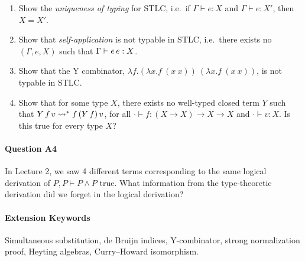 \documentclass[11pt,a4paper,twoside]{article}
\begin{document}
\begin{enumerate}[label=(\alph*)]
  \item Show the \emph{uniqueness of typing} for STLC, i.e.~if $\Gamma \vdash e : X$ and $\Gamma \vdash e : X'$,
  then $X = X'$.

  \item Show that \emph{self-application} is not typable in STLC, i.e.~there exists no $(\Gamma, e, X)$
  such that $\Gamma \vdash e \, e : X$.

  \item Show that the Y combinator, $\lambda f . (\lambda x . f\ (x\ x))\ (\lambda x . f\ (x\ x))$,
  is not typable in STLC.

  \item Show that for some type $X$, there exists no well-typed closed term $Y$ such that 
  $Y \, f \, v \rightsquigarrow^* f \, (Y \, f) \, v$,
  for all $\cdot \vdash f : (X \to X) \to X \to X$ and $\cdot \vdash v : X$.
  Is this true for every type $X$?
\end{enumerate}

\paragraph{Question A4} 
In Lecture 2, we saw 4 different terms corresponding to the same logical derivation of $P, P \vdash P \wedge P \text{ true}$. What information from the type-theoretic derivation did we forget in the logical derivation?

\paragraph{Extension Keywords} Simultaneous substitution, de Bruijn indices, Y-combinator, strong normalization proof, Heyting algebras, Curry--Howard isomorphism.
\end{document}
